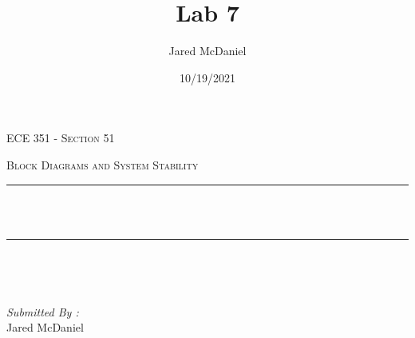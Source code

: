 \documentclass[12pt]{report}
\title{Lab 7}
\author{ Jared McDaniel}
\date{10/19/2021}
\makeatletter
\let\thetitle\@title
\makeatother
\begin{document}

\begin{titlepage}
	\centering
    \vspace*{0.5 cm}
\begin{center}    \textsc{\Large   ECE 351 - Section 51 }\\[2.0 cm]	\end{center}%
	\textsc{\Large Block Diagrams and System Stability  }\\[0.5 cm]				%
	\rule{\linewidth}{0.2 mm} \\[0.4 cm]
	{ \huge \bfseries \thetitle}\\
	\rule{\linewidth}{0.2 mm} \\[1.5 cm]
	
	\begin{minipage}{0.4\textwidth}
		\begin{flushleft} \large
			\end{flushleft}
			\end{minipage}~
			\begin{minipage}{0.4\textwidth}
            
			\begin{flushright} \large
			\emph{Submitted By :} \\
			Jared McDaniel  
		\end{flushright}
           
	\end{minipage}\\[2 cm]
	
    
    
    
    
	
\end{titlepage}


\tableofcontents
\pagebreak

\renewcommand{\thesection}{\arabic{section}}
\end{document}
